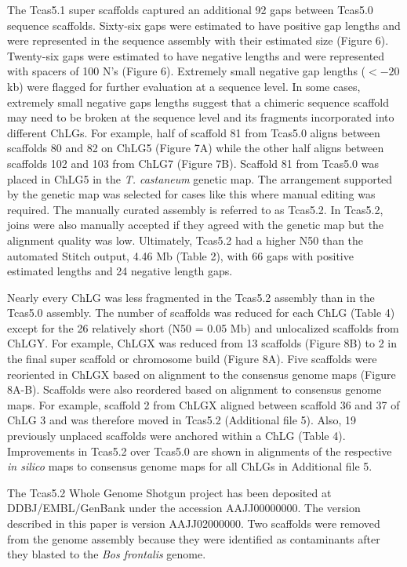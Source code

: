 \documentclass{bmcart}
\begin{document}
The Tcas5.1 super scaffolds captured an additional 92 gaps between Tcas5.0 sequence scaffolds. Sixty-six gaps were estimated to have positive gap lengths and were represented in the sequence assembly with their estimated size (Figure 6). Twenty-six gaps were estimated to have negative lengths and were represented with spacers of 100 N's (Figure 6). Extremely small negative gap lengths ($< -20$ kb) were flagged for further evaluation at a sequence level. In some cases, extremely small negative gaps lengths suggest that a chimeric sequence scaffold may need to be broken at the sequence level and its fragments incorporated into different ChLGs. For example, half of scaffold 81 from Tcas5.0 aligns between scaffolds 80 and 82 on ChLG5 (Figure 7A) while the other half aligns between scaffolds 102 and 103 from ChLG7 (Figure 7B). Scaffold 81 from Tcas5.0 was placed in ChLG5 in the \textit{T. castaneum} genetic map. The arrangement supported by the genetic map was selected for cases like this where manual editing was required. The manually curated assembly is referred to as Tcas5.2. In Tcas5.2, joins were also manually accepted if they agreed with the genetic map but the alignment quality was low. Ultimately, Tcas5.2 had a higher N50 than the automated Stitch output, 4.46 Mb (Table 2), with 66 gaps with positive estimated lengths and 24 negative length gaps. 

Nearly every ChLG was less fragmented in the Tcas5.2 assembly than in the Tcas5.0 assembly. The number of scaffolds was reduced for each ChLG (Table 4) except for the 26 relatively short (N50 = 0.05 Mb) and unlocalized scaffolds from ChLGY. For example, ChLGX was reduced from 13 scaffolds (Figure 8B) to 2 in the final super scaffold or chromosome build (Figure 8A). Five scaffolds were reoriented in ChLGX based on alignment to the consensus genome maps (Figure 8A-B). Scaffolds were also reordered based on alignment to consensus genome maps. For example, scaffold 2 from ChLGX aligned between scaffold 36 and 37 of ChLG 3 and was therefore moved in Tcas5.2 (Additional file 5). Also, 19 previously unplaced scaffolds were anchored within a ChLG (Table 4). Improvements in Tcas5.2 over Tcas5.0 are shown in alignments of the respective \textit{in silico} maps to consensus genome maps for all ChLGs in Additional file 5.

The Tcas5.2 Whole Genome Shotgun project has been deposited at DDBJ/EMBL/GenBank under the accession AAJJ00000000. The version described in this paper is version AAJJ02000000. Two scaffolds were removed from the genome assembly because they were identified as contaminants after they blasted to the \textit{Bos frontalis} genome.
\end{document}
